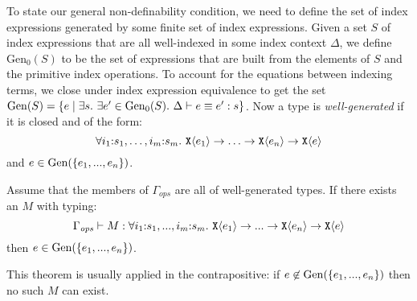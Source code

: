 To state our general non-definability condition, we need to define the
set of index expressions generated by some finite set of index
expressions. Given a set $S$ of index expressions that are all
well-indexed in some index context $\Delta$, we define
$\mathrm{Gen}_0(S)$ to be the set of expressions that are built from
the elements of $S$ and the primitive index operations. To account for
the equations between indexing terms, we close under index expression
equivalence to get the set $\Gen(S) = \{ e \sepbar \exists s.\ \exists
e' \in \mathrm{Gen}_0(S).\ \Delta \vdash e \equiv e' : s \}$. Now a
type is \emph{well-generated} if it is closed and of the form:
\begin{displaymath}
  \forall i_1\mathord:s_1,\ldots,i_m\mathord:s_m.~\textup{\texttt{X}}\langle e_1 \rangle \to \ldots \to \textup{\texttt{X}}\langle e_n \rangle \to \textup{\texttt{X}}\langle e \rangle
\end{displaymath}
and $e \in \mathrm{Gen}(\{e_1,...,e_n\})$.
\begin{theorem}\label{thm:general-nondef}
  Assume that the members of $\Gamma_{\mathit{ops}}$ are all of
  well-generated types. If there exists an $M$ with typing:
  \begin{displaymath}
    \Gamma_{\mathit{ops}} \vdash M : \forall i_1\mathord:s_1,...,i_m\mathord:s_m.~\textup{\texttt{X}}\langle e_1 \rangle \to ... \to \textup{\texttt{X}}\langle e_n \rangle \to \textup{\texttt{X}}\langle e \rangle
  \end{displaymath}
  then $e \in \mathrm{Gen}(\{e_1,...,e_n\})$.
\end{theorem}
This theorem is usually applied in the contrapositive: if $e \not\in
\mathrm{Gen}(\{e_1,...,e_n\})$ then no such $M$ can exist.
